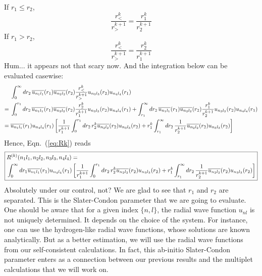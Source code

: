 If $r_1 \le r_2$,
\begin{equation}
\frac{r_<^k}{r_>^{k+1}} = \frac{r_1^k}{r_2^{k+1}}
\end{equation}
If $r_1 > r_2$,
\begin{equation}
\frac{r_<^k}{r_>^{k+1}} = \frac{r_2^k}{r_1^{k+1}}
\end{equation}
%
Hum... it appears not that scary now. And the integration below can be evaluated casewise:
\begin{align} \label{eq:r1r2Split}
  {} & \int_0^\infty dr_2\, \overline{u_{n_1l_1}}(r_1) \overline{u_{n_2l_2}}(r_2)
       \frac{r_<^k}{r_>^{k+1}} u_{n_3l_3}(r_2) u_{n_4l_4}(r_1) \nonumber \\
= {} & \int_0^{r_1} dr_2\, \overline{u_{n_1l_1}}(r_1) \overline{u_{n_2l_2}}(r_2)
       \frac{r_2^k}{r_1^{k+1}} u_{n_3l_3}(r_2) u_{n_4l_4}(r_1)
       + \int_{r_1}^\infty dr_2\, \overline{u_{n_1l_1}}(r_1) \overline{u_{n_2l_2}}(r_2)
       \frac{r_1^k}{r_2^{k+1}} u_{n_3l_3}(r_2) u_{n_4l_4}(r_1) \nonumber \\
= {} & \overline{u_{n_1l_1}}(r_1)u_{n_4l_4}(r_1)
       \left[ \frac{1}{r_1^{k+1}} \int_0^{r_1} dr_2\, r_2^k \overline{u_{n_2l_2}}(r_2)u_{n_3l_3}(r_2)
       + r_1^k \int_{r_1}^\infty dr_2\, \frac{1}{r_2^{k+1}} \overline{u_{n_2l_2}}(r_2)u_{n_3l_3}(r_2) \right]
\end{align}
%
Hence, Eqn.~(\ref{eq:Rk}) reads
\begin{equation} \label{eq:RkSplit}
\boxed{
\begin{aligned}
& R^{(k)}(n_1l_1,n_2l_2,n_3l_3,n_4l_4) = \\
& \int_0^\infty dr_1
\overline{u_{n_1l_1}}(r_1)u_{n_4l_4}(r_1)
\left[ \frac{1}{r_1^{k+1}} \int_0^{r_1} dr_2\, r_2^k \overline{u_{n_2l_2}}(r_2)u_{n_3l_3}(r_2)
+ r_1^k \int_{r_1}^\infty dr_2\, \frac{1}{r_2^{k+1}} \overline{u_{n_2l_2}}(r_2)u_{n_3l_3}(r_2) \right]
\end{aligned}
}
\end{equation}
%
Absolutely under our control, not? We are glad to see that $r_1$ and $r_2$ are separated.
This is the Slater-Condon parameter that we are going to evaluate.
One should be aware that for a given index $\{n,l\}$, the radial wave
function $u_{nl}$ is not uniquely determined. It depends on the choice
of the system. For instance, one can use the hydrogen-like radial wave functions,
whose solutions are known analytically. But as a better estimation,
we will use the radial wave functions from our self-consistent
calculations. In fact, this ab-initio Slater-Condon parameter
enters as a connection between our previous results
and the multiplet calculations that we will work on.

